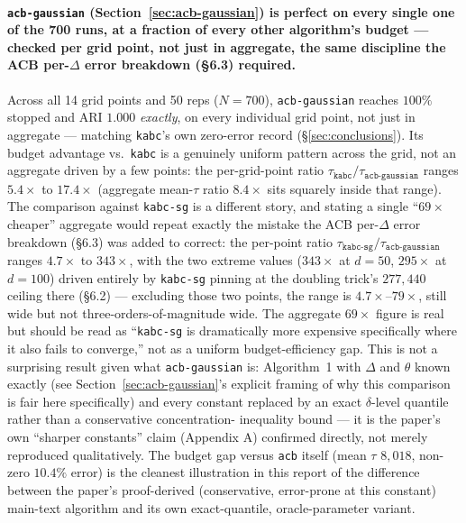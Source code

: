 \documentclass[11pt]{article}
\begin{document}
\paragraph{\texttt{acb-gaussian} (Section~\ref{sec:acb-gaussian}) is
perfect on every single one of the 700 runs, at a fraction of every other
algorithm's budget --- checked per grid point, not just in aggregate, the
same discipline the ACB per-$\Delta$ error breakdown (\S6.3) required.}
Across all 14 grid points and 50 reps ($N=700$), \texttt{acb-gaussian}
reaches $100\%$ stopped and ARI $1.000$ \emph{exactly}, on every
individual grid point, not just in aggregate --- matching \texttt{kabc}'s
own zero-error record (\S\ref{sec:conclusions}). Its budget advantage vs.\
\texttt{kabc} is a genuinely uniform pattern across the grid, not an
aggregate driven by a few points: the per-grid-point ratio
$\tau_{\texttt{kabc}}/\tau_{\texttt{acb-gaussian}}$ ranges $5.4\times$ to
$17.4\times$ (aggregate mean-$\tau$ ratio $8.4\times$ sits squarely inside
that range). The comparison against \texttt{kabc-sg} is a different
story, and stating a single ``$69\times$ cheaper'' aggregate would repeat
exactly the mistake the ACB per-$\Delta$ error breakdown (\S6.3) was added
to correct: the per-point ratio
$\tau_{\texttt{kabc-sg}}/\tau_{\texttt{acb-gaussian}}$ ranges $4.7\times$
to $343\times$, with the two extreme values ($343\times$ at $d=50$,
$295\times$ at $d=100$) driven entirely by \texttt{kabc-sg} pinning at the
doubling trick's $277{,}440$ ceiling there (\S6.2) --- excluding those two
points, the range is $4.7\times$--$79\times$, still wide but not
three-orders-of-magnitude wide. The aggregate $69\times$ figure is real
but should be read as ``\texttt{kabc-sg} is dramatically more expensive
specifically where it also fails to converge,'' not as a uniform
budget-efficiency gap. This is not a surprising result given what
\texttt{acb-gaussian} is: Algorithm~1 with $\Delta$ and $\theta$ known
exactly (see Section~\ref{sec:acb-gaussian}'s explicit framing of why this
comparison is fair here specifically) and every constant replaced by an
exact $\delta$-level quantile rather than a conservative concentration-
inequality bound --- it is the paper's own ``sharper constants'' claim
(Appendix A) confirmed directly, not merely reproduced qualitatively. The
budget gap versus \texttt{acb} itself (mean $\tau$ $8{,}018$, non-zero
$10.4\%$ error) is the cleanest illustration in this report of the
difference between the paper's proof-derived (conservative, error-prone at
this constant) main-text algorithm and its own exact-quantile,
oracle-parameter variant.
\end{document}
